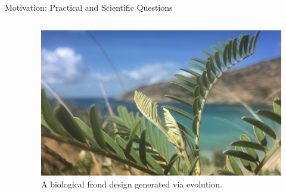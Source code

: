 \begin{frame}{Motivation: Practical and Scientific Questions}
\begin{columns}
\begin{column}{0.6\textwidth}

\end{column}
\begin{column}{0.4\textwidth}
\begin{center}
\begin{figure}
\includegraphics[width=\textwidth,trim={43cm 0 47cm 8cm},clip]{img/island_fern}
\caption{A biological frond design generated via evolution.}
\end{figure}
\end{center}
\end{column}
\end{columns}
\end{frame}